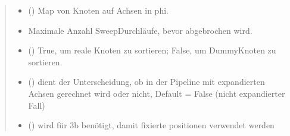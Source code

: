 \documentclass[a4paper,10pt,ngerman]{sphinxmanual}
\begin{document}
\begin{fulllineitems}
\begin{quote}
\begin{description}
\begin{itemize}
\item {} 
\sphinxAtStartPar
{} () \textendash{} Map von Knoten auf Achsen in phi.

\item {} 
\sphinxAtStartPar
{} \textendash{} Maximale Anzahl Sweep\sphinxhyphen{}Durchläufe, bevor abgebrochen wird.

\item {} 
\sphinxAtStartPar
{} () \textendash{} True, um reale Knoten zu sortieren; False, um Dummy\sphinxhyphen{}Knoten zu sortieren.

\item {} 
\sphinxAtStartPar
{} () \textendash{} dient der Unterscheidung, ob in der Pipeline mit expandierten Achsen gerechnet wird oder nicht, Default = False (nicht expandierter Fall)

\item {} 
\sphinxAtStartPar
{} () \textendash{} wird für 3b benötigt, damit fixierte positionen verwendet werden

\end{itemize}

\sphinxAtStartPar
{}

\end{description}\end{quote}

\end{fulllineitems}

\end{document}
